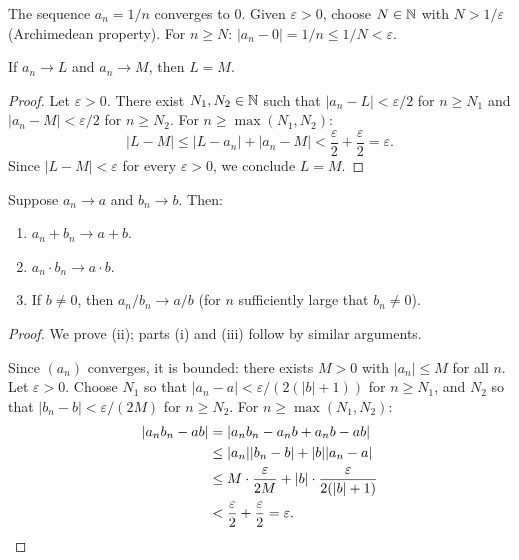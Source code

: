 \documentclass[11pt,a4paper]{article}
\begin{document}
\begin{example}
\label{ex:seq_1_over_n}
The sequence $a_n = 1/n$ converges to $0$. Given $\varepsilon > 0$,
choose $N \in \mathbb{N}$ with $N > 1/\varepsilon$ (Archimedean property). For
$n \ge N$: $|a_n - 0| = 1/n \le 1/N < \varepsilon$.
\end{example}

\begin{theorem}
\label{thm:unique_limit}
If $a_n \to L$ and $a_n \to M$, then $L = M$.
\end{theorem}

\begin{proof}
Let $\varepsilon > 0$. There exist $N_1, N_2 \in \mathbb{N}$ such that
$|a_n - L| < \varepsilon/2$ for $n \ge N_1$ and $|a_n - M| <
\varepsilon/2$ for $n \ge N_2$. For $n \ge \max(N_1, N_2)$:
\[
  |L - M| \le |L - a_n| + |a_n - M|
  < \frac{\varepsilon}{2} + \frac{\varepsilon}{2} = \varepsilon.
\]
Since $|L - M| < \varepsilon$ for every $\varepsilon > 0$, we conclude
$L = M$.
\end{proof}

\begin{theorem}
\label{thm:alg_limit}
Suppose $a_n \to a$ and $b_n \to b$. Then:
\begin{enumerate}[nosep,label=(\roman*)]
  \item $a_n + b_n \to a + b$.
  \item $a_n \cdot b_n \to a \cdot b$.
  \item If $b \neq 0$, then $a_n / b_n \to a / b$ (for $n$ sufficiently
    large that $b_n \neq 0$).
\end{enumerate}
\end{theorem}

\begin{proof}
We prove (ii); parts (i) and (iii) follow by similar arguments.

Since $(a_n)$ converges, it is bounded: there exists $M > 0$ with
$|a_n| \le M$ for all $n$. Let $\varepsilon > 0$. Choose $N_1$ so that
$|a_n - a| < \varepsilon/(2(|b| + 1))$ for $n \ge N_1$, and $N_2$ so
that $|b_n - b| < \varepsilon/(2M)$ for $n \ge N_2$. For
$n \ge \max(N_1, N_2)$:
\begin{align*}
  |a_n b_n - ab|
  &= |a_n b_n - a_n b + a_n b - ab| \\
  &\le |a_n||b_n - b| + |b||a_n - a| \\
  &\le M \cdot \frac{\varepsilon}{2M}
       + |b| \cdot \frac{\varepsilon}{2(|b|+1)} \\
  &< \frac{\varepsilon}{2} + \frac{\varepsilon}{2} = \varepsilon.
    \qedhere
\end{align*}
\end{proof}
\end{document}
